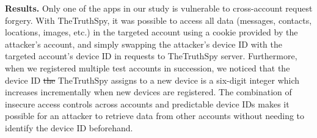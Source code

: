 \documentclass[sigconf,balance=false]{acmart}
\newcommand{\sumanth}[1]{\textcolor{violet}{\noindent[SR: #1]}}
\newcommand{\damon}[1]{\textcolor{blue}{\noindent[DM: #1]}}
\newcommand{\geoff}[1]{\textcolor{purple}{\noindent[GV: #1]}}
\newcommand{\sumanth}[1]{}
\newcommand{\geoff}[1]{}
\newcommand{\damon}[1]{}
\providecommand{\DIFadd}[1]{{\protect\color{blue}\uwave{#1}}} %
\providecommand{\DIFdel}[1]{{\protect\color{red}\sout{#1}}}                      %
\providecommand{\DIFaddbegin}{} %
\providecommand{\DIFaddend}{} %
\providecommand{\DIFdelbegin}{} %
\providecommand{\DIFdelend}{} %
\newcommand{\DIFscaledelfig}{0.5}
\newlength{\DIFdelgraphicswidth} %
\newlength{\DIFdelgraphicsheight} %
\newcommand{\DIFaddincludegraphics}[2][]{{\color{blue}\fbox{\DIFOincludegraphics[#1]{#2}}}} %
\newcommand{\DIFdelincludegraphics}[2][]{%
\sbox{\DIFdelgraphicsbox}{\DIFOincludegraphics[#1]{#2}}%
\settoboxwidth{\DIFdelgraphicswidth}{\DIFdelgraphicsbox} %
\settoboxtotalheight{\DIFdelgraphicsheight}{\DIFdelgraphicsbox} %
\scalebox{\DIFscaledelfig}{%
\parbox[b]{\DIFdelgraphicswidth}{\usebox{\DIFdelgraphicsbox}\\[-\baselineskip] \rule{\DIFdelgraphicswidth}{0em}}\llap{\resizebox{\DIFdelgraphicswidth}{\DIFdelgraphicsheight}{%
\setlength{\unitlength}{\DIFdelgraphicswidth}%
\begin{picture}(1,1)%
\thicklines\linethickness{2pt} %
{\color[rgb]{1,0,0}\put(0,0){\framebox(1,1){}}}%
{\color[rgb]{1,0,0}\put(0,0){\line( 1,1){1}}}%
{\color[rgb]{1,0,0}\put(0,1){\line(1,-1){1}}}%
\end{picture}%
}\hspace*{3pt}}} %
} %
\DeclareRobustCommand{\DIFaddbegin}{\DIFOaddbegin \let\includegraphics\DIFaddincludegraphics} %
\DeclareRobustCommand{\DIFaddend}{\DIFOaddend \let\includegraphics\DIFOincludegraphics} %
\DeclareRobustCommand{\DIFdelbegin}{\DIFOdelbegin \let\includegraphics\DIFdelincludegraphics} %
\DeclareRobustCommand{\DIFdelend}{\DIFOaddend \let\includegraphics\DIFOincludegraphics} %
\begin{document}
\textbf{Results.}  Only one of the apps in our study is vulnerable to
cross-account request forgery.
With TheTruthSpy, it was possible to
access all data (messages, contacts, locations, images, etc.)  in the
targeted account using a cookie provided by the attacker's account,
and simply swapping the attacker's device ID with the targeted
account's device ID in requests to TheTruthSpy server.  Furthermore,
when we registered multiple test accounts in succession, we noticed
that the device ID \DIFdelbegin \DIFdel{the }\DIFdelend \DIFaddbegin \DIFadd{that }\DIFaddend TheTruthSpy assigns to a new device is a six-digit
integer which increases incrementally when new devices are registered.
The combination of insecure access controls across accounts and
predictable device IDs makes it possible for an attacker to retrieve
data from other accounts without needing to identify the device ID
beforehand.



\end{document}
